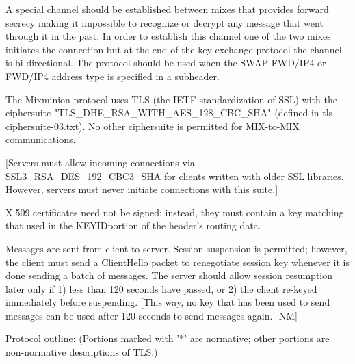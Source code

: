 A special channel should be established between mixes that provides
forward secrecy making it impossible to recognize or decrypt any
message that went through it in the past. In order to establish this
channel one of the two mixes initiates the connection but at the end
of the key exchange protocol the channel is bi-directional. The
protocol should be used when the SWAP-FWD/IP4 or FWD/IP4 address type
is specified in a subheader.

The Mixminion protocol uses TLS (the IETF standardization of SSL) with
the ciphersuite "TLS_DHE_RSA_WITH_AES_128_CBC_SHA" (defined in
tls-ciphersuite-03.txt).  No other ciphersuite is permitted for
MIX-to-MIX communications.

[Servers must allow incoming connections via SSL3_RSA_DES_192_CBC3_SHA
for clients written with older SSL libraries.  However, servers must
never initiate connections with this suite.]

X.509 certificates need not be signed; instead, they must contain
a key matching that used in the KEYIDportion of the header's routing
data.  

Messages are sent from client to server.  Session suspension is
permitted; however, the client must send a ClientHello packet to
renegotiate session key whenever it is done sending a batch of
messages.  The server should allow session resumption later only if 1)
less than 120 seconds have passed, or 2) the client re-keyed
immediately before suspending.  [This way, no key that has been used
to send messages can be used after 120 seconds to send messages
again. -NM]

Protocol outline: (Portions marked with '*' are normative; other
portions are non-normative descriptions of TLS.)

